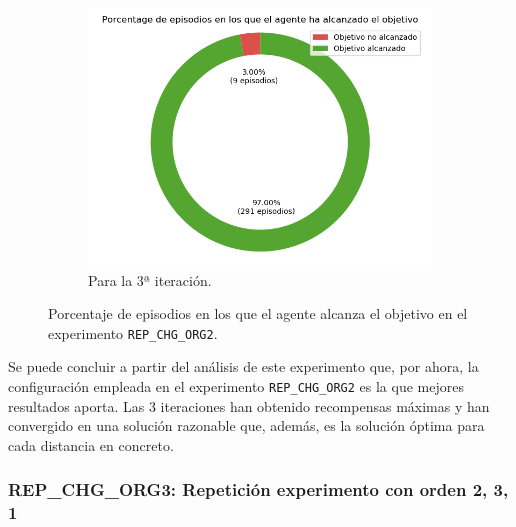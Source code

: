 \begin{figure}
\begin{subfigure}{.5\textwidth}
    \end{subfigure}
    \begin{subfigure}{.5\textwidth}
        \centering
        \includegraphics[scale=0.3]{cap5_experimentacion/images/CHANGE_ORIGIN-20_09-00_52-1, 0, 2_it3_porcentajeResuelto.png}
        \caption{Para la 3ª iteración.}
        \label{fig:CHANGE_ORIGIN-20_09-00_52-1, 0, 2_it3_porcentajeResuelto}
    \end{subfigure}%
    \caption{Porcentaje de episodios en los que el agente alcanza el objetivo en el experimento \texttt{REP\_CHG\_ORG2}.}
    \label{fig:CHANGE_ORIGIN-20_09-00_52-1, 0, 2_porcentajeResuelto}
\end{figure}

Se puede concluir a partir del análisis de este experimento que, por ahora, la configuración empleada en el experimento \texttt{REP\_CHG\_ORG2} es la que mejores resultados aporta. Las 3 iteraciones han obtenido recompensas máximas y han convergido en una solución razonable que, además, es la solución óptima para cada distancia en concreto. 
 
\subsubsection{REP\_CHG\_ORG3: Repetición experimento con orden 2, 3, 1} \label{REP_CHG_ORG3}

